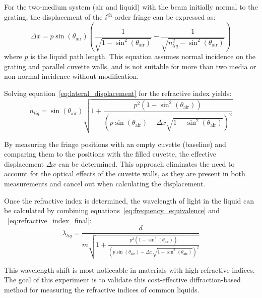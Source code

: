 For the two-medium system (air and liquid) with the beam initially
normal to the grating, the displacement of the \(i^{\text{th}}\)-order
fringe can be expressed as:
\begin{equation}
    \Delta x = p \sin(\theta_{\text{air}}) \left(\frac{1}{\sqrt{1 - \sin^2(\theta_{\text{air}})}} - \frac{1}{\sqrt{n_{liq}^2 - \sin^2(\theta_{\text{air}})}}\right)
    \label{eq:lateral_displacement}
\end{equation}
where \(p\) is the liquid path length.
This equation assumes normal incidence on the grating and parallel
cuvette walls, and is not suitable for more than two media or
non-normal incidence without modification.

Solving equation~\eqref{eq:lateral_displacement} for the refractive index yields:
\begin{equation}
    n_{liq} = \sin(\theta_{\text{air}}) \sqrt{1 + \frac{p^2 (1 - \sin^2(\theta_{\text{air}}))}{(p \sin(\theta_{\text{air}}) - \Delta x \sqrt{1 - \sin^2(\theta_{\text{air}})})^2}}
    \label{eq:refractive_index_final}
\end{equation}

By measuring the fringe positions with an empty cuvette (baseline) and
comparing them to the positions with the filled cuvette, the effective
displacement \(\Delta x\) can be determined.
This approach eliminates the need to account for the optical effects of
the cuvette walls, as they are present in both measurements and cancel
out when calculating the displacement.

Once the refractive index is determined, the wavelength of light in the
liquid can be calculated by combining equations~\eqref{eq:frequency_equivalence} and ~\eqref{eq:refractive_index_final}:
\begin{equation}
    \lambda_{liq} = \frac{d}{m \sqrt{1 + \frac{p^2 (1 - \sin^2(\theta_{\text{air}}))}{(p \sin(\theta_{\text{air}}) - \Delta x \sqrt{1 - \sin^2(\theta_{\text{air}})})^2}}}
    \label{eq:wavelength_in_liquid}
\end{equation}

This wavelength shift is most noticeable in materials with high
refractive indices.
The goal of this experiment is to validate this cost-effective
diffraction-based method for measuring the refractive indices of common
liquids.

